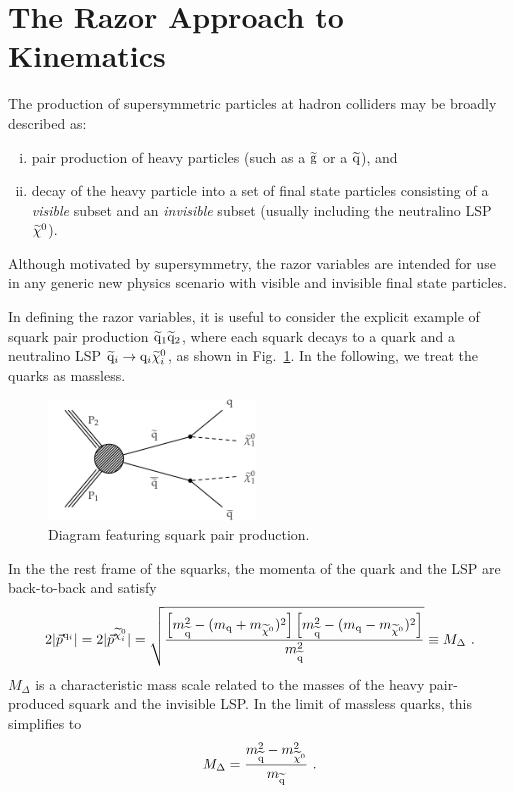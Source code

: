 \section{The Razor Approach to Kinematics}
\label{sec:kinematic}

The production of supersymmetric particles at hadron colliders may be
broadly described as:
\begin{enumerate}[(i)]
\item pair production of heavy particles (such as a $\mathrm{\widetilde{g}}$ or a
  $\mathrm{\widetilde{q}}$), and
\item decay of the heavy particle into a set of final state
  particles consisting of a \emph{visible} subset and an
  \emph{invisible} subset (usually including the neutralino LSP $\widetilde{\chi}^{0}$).
\end{enumerate}
Although motivated by supersymmetry, the razor variables are intended for use in any generic new physics
scenario with visible and invisible final state particles. 

In defining the razor variables, it is useful to consider the explicit
example of squark pair production $\mathrm{\widetilde{q}}_1\mathrm{\widetilde{q}}_2$, where each squark
decays to a quark and a neutralino LSP $\mathrm{\widetilde{q}}_i\to\mathrm{q}_i\widetilde{\chi}^{0}_{i}$, as shown in
Fig.~\ref{fig:T2}. In the following, we treat the quarks as massless.
\begin{figure}[thb!]
\centering
\includegraphics[width=0.49\textwidth]{figs/theory/T2.pdf}
\caption{Diagram featuring squark pair production.\label{fig:T2}}
\end{figure}
In the the rest frame of the squarks, the momenta of the
quark and the LSP are back-to-back and satisfy 
\begin{equation}
2|\vec{p}^{\mathrm{q}_i} | = 2|\vec{p}^{\widetilde{\chi}^{0}_{i}} | =\sqrt{
\frac{\left[m_{\mathrm{\widetilde{q}}}^2-(m_{\mathrm{q}}+m_{\widetilde{\chi}^{0}})^2\right]\left[m_{\mathrm{\widetilde{q}}}^2-(m_{\mathrm{q}}-m_{\widetilde{\chi}^{0}}
    )^2\right]}{m_{\mathrm{\widetilde{q}}}^2}} \equiv M_{\Delta} ~.
\end{equation}
$M_{\Delta}$ is a characteristic mass scale related to the
masses of the heavy pair-produced squark and the invisible LSP. In the
limit of massless quarks, this simplifies to 
\begin{equation}
M_{\Delta} =
\frac{m_{\mathrm{\widetilde{q}}}^2-m_{\widetilde{\chi}^{0}}^2}{m_{\mathrm{\widetilde{q}}}}~.
\end{equation}

